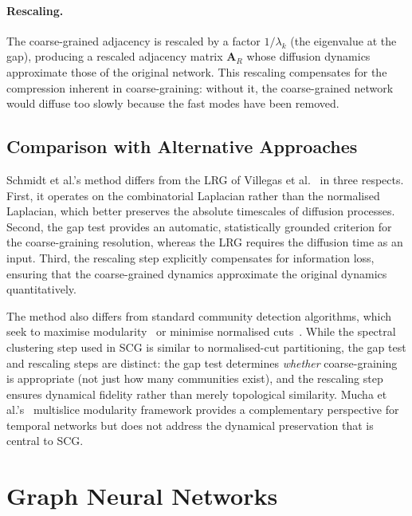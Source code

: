 \paragraph{Rescaling.}  The coarse-grained adjacency is rescaled by
a factor $1/\lambda_k$ (the eigenvalue at the gap), producing a
rescaled adjacency matrix $\mathbf{A}_R$ whose diffusion dynamics
approximate those of the original network.  This rescaling compensates
for the compression inherent in coarse-graining: without it, the
coarse-grained network would diffuse too slowly because the fast modes
have been removed.

\subsection{Comparison with Alternative Approaches}
\label{sec:scg_comparison}

Schmidt et al.'s method differs from the LRG of Villegas et
al.~\cite{villegas2023laplacian} in three respects.  First, it operates
on the combinatorial Laplacian rather than the normalised Laplacian,
which better preserves the absolute timescales of diffusion processes.
Second, the gap test provides an automatic, statistically grounded
criterion for the coarse-graining resolution, whereas the LRG requires
the diffusion time as an input.  Third, the rescaling step explicitly
compensates for information loss, ensuring that the coarse-grained
dynamics approximate the original dynamics quantitatively.

The method also differs from standard community detection algorithms,
which seek to maximise modularity~\cite{fortunato2016community} or
minimise normalised cuts~\cite{ng2002spectral,luxburg2007tutorial}.
While the spectral clustering step used in SCG is similar to normalised-cut
partitioning, the gap test and rescaling steps are distinct: the gap test
determines \emph{whether} coarse-graining is appropriate (not just how
many communities exist), and the rescaling step ensures dynamical
fidelity rather than merely topological similarity.  Mucha et
al.'s~\cite{mucha2010community} multislice modularity framework provides
a complementary perspective for temporal networks but does not address
the dynamical preservation that is central to SCG.


\section{Graph Neural Networks}
\label{sec:gnn_background}

